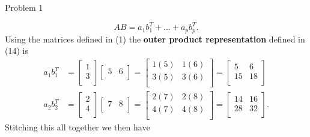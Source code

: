 \begin{problem}{Problem 1}
\begin{highlight}[Solution]
        \begin{equation}
            AB = a_{1}b_{1}^{T} + \dots + a_{p}b_{p}^{T}.
        \end{equation}
        Using the matrices defined in (1) the \textbf{outer product representation} defined in (14) is 
        \begin{align*}
            a_{1}b_{1}^{T} & = 
            \begin{bmatrix}
                1 \\
                3 \\
            \end{bmatrix}
            \begin{bmatrix}
                5 & 6 \\
            \end{bmatrix}
            = 
            \begin{bmatrix}
                1(5) & 1(6) \\
                3(5) & 3(6) \\
            \end{bmatrix}
            = 
            \begin{bmatrix}
                5 & 6 \\
                15 & 18 \\
            \end{bmatrix} \\
            a_{2}b_{2}^{T} & = 
            \begin{bmatrix}
                2 \\
                4 \\
            \end{bmatrix}
            \begin{bmatrix}
                7 & 8 \\
            \end{bmatrix}
            = 
            \begin{bmatrix}
                2(7) & 2(8) \\
                4(7) & 4(8) \\
            \end{bmatrix}
            = 
            \begin{bmatrix}
                14 & 16 \\
                28 & 32 \\
            \end{bmatrix}.
        \end{align*}
        Stitching this all together we then have 


\end{highlight}
\end{problem}
